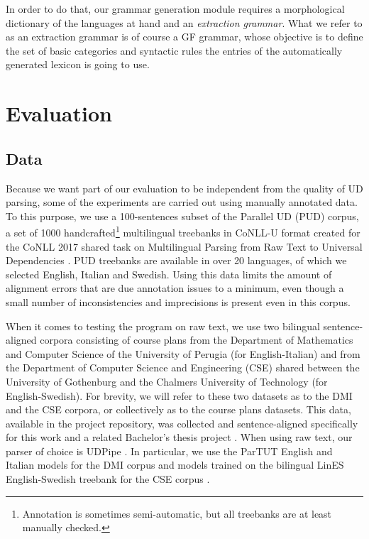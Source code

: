 \documentclass[11pt]{article}
\begin{document}
In order to do that, our grammar generation module requires a morphological dictionary of the languages at hand and an \textit{extraction grammar}. 
What we refer to as an extraction grammar is of course a GF grammar, whose objective is to define the set of basic categories and syntactic rules the entries of the automatically generated lexicon is going to use.


\section{Evaluation} \label{evaluation}
\subsection{Data}
Because we want part of our evaluation to be independent from the quality of UD parsing, some of the experiments are carried out using manually annotated data. 
To this purpose, we use a 100-sentences subset of the Parallel UD (PUD) corpus, a set of 1000 handcrafted\footnote{Annotation is sometimes semi-automatic, but all treebanks are at least manually checked.} multilingual treebanks in CoNLL-U format created for the CoNLL 2017 shared task on Multilingual Parsing from Raw Text to Universal Dependencies \cite{dummy}.
PUD treebanks are available in over 20 languages, of which we selected English, Italian and Swedish. 
Using this data limits the amount of alignment errors that are due annotation issues to a minimum, even though a small number of inconsistencies and imprecisions is present even in this corpus.

When it comes to testing the program on raw text, we use two bilingual sentence-aligned corpora consisting of course plans from the Department of Mathematics and Computer Science of the University of Perugia (for English-Italian) and from the Department of Computer Science and Engineering (CSE) shared between the University of Gothenburg and the Chalmers University of Technology (for English-Swedish). 
For brevity, we will refer to these two datasets as to the DMI and the CSE corpora, or collectively as to the course plans datasets.
This data, available in the project repository, was collected and sentence-aligned specifically for this work and a related Bachelor's thesis project \cite{dummy}.
When using raw text, our parser of choice is UDPipe \cite{dummy}. 
In particular, we use the ParTUT English and Italian models for the DMI corpus and models trained on the bilingual LinES English-Swedish treebank for the CSE corpus \cite{dummy}.
\end{document}
